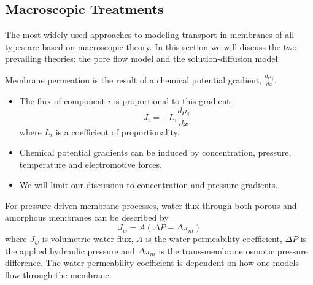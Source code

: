   \subsection{Macroscopic Treatments}
  
  The most widely used approaches to modeling transport in membranes of all types
  are based on macroscopic theory. In this section we will discuss the two prevailing
  theories: the pore flow model and the solution-diffusion model.
  
  \noindent Membrane permeation is the result of a chemical potential gradient, $\frac{d\mu_i}{dx}$.
  \begin{itemize}
	  \item The flux of component $i$ is proportional to this gradient:
	  \begin{equation}
	    J_i = -L_i \frac{d\mu_i}{dx}
	  \end{equation}
	  where $L_i$ is a coefficient of proportionality.~\cite{wijmans_solution-diffusion_1995}
	  \item Chemical potential gradients can be induced by concentration, pressure, 
	  temperature and electromotive forces.
	  \item We will limit our discussion to concentration and pressure gradients. %
  \end{itemize}

  For pressure driven membrane processes, water flux through both porous and 
  amorphous membranes can be described by
  \begin{equation}
  J_w = A(\Delta P - \Delta \pi_m)
  \end{equation}
  where $J_w$ is volumetric water flux, $A$ is the water permeability coefficient,
  $\Delta P$ is the applied hydraulic pressure and $\Delta \pi_m$ is the 
  trans-membrane osmotic pressure difference. The water permeability coefficient
  is dependent on how one models flow through the membrane.

